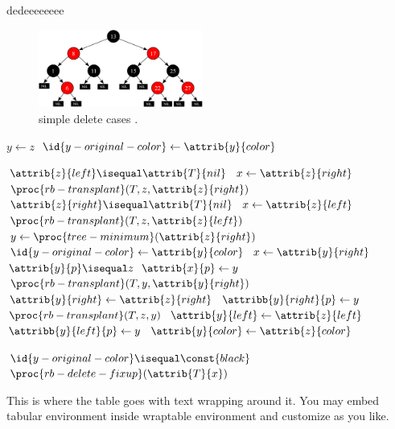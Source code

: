 \documentclass[a4paper,12pt]{article}
\begin{document}
dedeeeeeeee
\begin{figure} 
   \begin{center}
    \includegraphics[width=0.48\textwidth]{rb_sample.png}
   \end{center}
   \vspace{-20pt}
   \caption{ simple delete cases .  } 
   \label{rb_delete_cases_single} 
   \vspace{-10pt}
 \end{figure}
\begin{codebox}
    \li    $y \gets z$
    \li    $\id{y-original-color} \gets \attrib{y}{color}$
    
    \li    \If $ \attrib{z}{left} \isequal \attrib{T}{nil} $
    \li        \Then  $ x  \gets \attrib{z}{right}$
    \li               $ \proc{rb-transplant}(T,z,\attrib{z}{right}) $
    \li    \ElseIf    $\attrib{z}{right} \isequal \attrib{T}{nil} $
    \li        \Then  $ x  \gets \attrib{z}{left} $
    \li               $ \proc{rb-transplant}(T,z,\attrib{z}{left}) $
    \li    \Else  $ y \gets \proc{tree-minimum}(\attrib{z}{right}) $
    \li           $ \id{y-original-color} \gets \attrib{y}{color} $  			  
    \li           $ x \gets \attrib{y}{right} $       
    \li           \If $ \attrib{y}{p} \isequal  z $		
    \li             \Then $ \attrib{x}{p}\gets y $
    \li           \Else  $ \proc{rb-transplant}(T,y,\attrib{y}{right}) $ 
    \li                  $ \attrib{y}{right} \gets \attrib{z}{right} $
    \li                  $ \attribb{y}{right}{p} \gets y $ 
    \End
    \li           $ \proc{rb-transplant}(T,z,y) $ 
    \li           $ \attrib{y}{left} \gets \attrib{z}{left} $ 
    \li           $ \attribb{y}{left}{p} \gets y $ 
    \li           $ \attrib{y}{color} \gets \attrib{z}{color} $ 
    \End
    
    \li    \If $ \id{y-original-color} \isequal \const{black} $
    \li       \Then $\proc{rb-delete-fixup}(\attrib{T}{x})$
    \End
\end{codebox}
\vspace{20pt}
\par
This is where the table goes with text wrapping around it. You may 
embed tabular environment inside wraptable environment and customize as you like.
\end{document}
